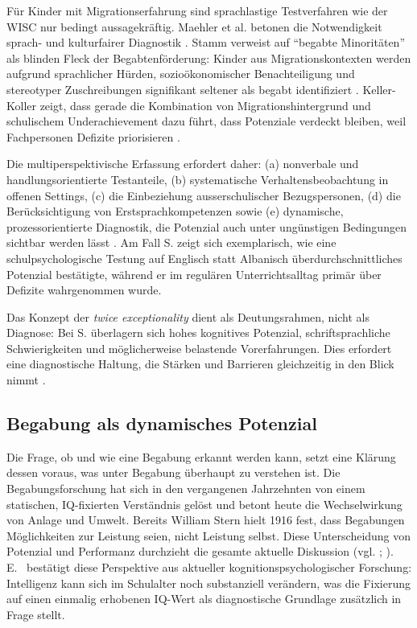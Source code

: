 \documentclass[ngerman, a4paper]{article}
\begin{document}
Für Kinder mit Migrationserfahrung sind sprachlastige Testverfahren wie der WISC nur
bedingt aussagekräftig. Maehler et al. betonen die Notwendigkeit sprach- und kulturfairer
Diagnostik \parencite{maehler2018diagnostik}. Stamm verweist auf \enquote{begabte Minoritäten}
als blinden Fleck der Begabtenförderung: Kinder aus Migrationskontexten werden aufgrund
sprachlicher Hürden, sozioökonomischer Benachteiligung und stereotyper Zuschreibungen
signifikant seltener als begabt identifiziert
\parencite{stamm2021fehlenderblick,stamm2014handbuch}.
Keller-Koller zeigt, dass gerade die Kombination von Migrationshintergrund und
schulischem Underachievement dazu führt, dass Potenziale verdeckt bleiben, weil
Fachpersonen Defizite priorisieren \parencite{kellerkoller2021hellekoepfe,kellerkoller2009begabte}.
 
Die multiperspektivische Erfassung erfordert daher: (a) nonverbale und handlungsorientierte
Testanteile, (b) systematische Verhaltensbeobachtung in offenen Settings,
(c) die Einbeziehung ausserschulischer Bezugspersonen, (d) die Berücksichtigung von
Erstsprachkompetenzen sowie (e) dynamische, prozessorientierte Diagnostik, die Potenzial
auch unter ungünstigen Bedingungen sichtbar werden lässt
\parencite{ipege2009professionelle,reutlinger2015hochbegabung,uslucan2012begabung}.
Am Fall S. zeigt sich exemplarisch, wie eine schulpsychologische Testung auf Englisch
statt Albanisch überdurchschnittliches Potenzial bestätigte, während er im regulären
Unterrichtsalltag primär über Defizite wahrgenommen wurde.
 
Das Konzept der \textit{twice exceptionality} dient als Deutungsrahmen, nicht als Diagnose:
Bei S. überlagern sich hohes kognitives Potenzial, schriftsprachliche Schwierigkeiten und
möglicherweise belastende Vorerfahrungen. Dies erfordert eine diagnostische Haltung,
die Stärken und Barrieren gleichzeitig in den Blick nimmt
\parencite{preckel2013hochbegabung,lehwald2017motivation}.


\subsection{Begabung als dynamisches Potenzial}

Die Frage, ob und wie eine Begabung erkannt werden kann, setzt eine Klärung dessen
voraus, was unter Begabung überhaupt zu verstehen ist. Die Begabungsforschung hat sich
in den vergangenen Jahrzehnten von einem statischen, IQ-fixierten Verständnis gelöst und
betont heute die Wechselwirkung von Anlage und Umwelt. Bereits William Stern hielt
1916 fest, dass Begabungen Möglichkeiten zur Leistung seien, nicht Leistung selbst.
Diese Unterscheidung von Potenzial und Performanz durchzieht die gesamte aktuelle
Diskussion (vgl. \textcite{preckel2013hochbegabung}; \textcite{trautmann2016einfuehrung}).
E.~\textcite{stern2025intelligenz} bestätigt diese Perspektive aus aktueller
kognitionspsychologischer Forschung: Intelligenz kann sich im Schulalter noch
substanziell verändern, was die Fixierung auf einen einmalig erhobenen IQ-Wert als
diagnostische Grundlage zusätzlich in Frage stellt.
\end{document}

